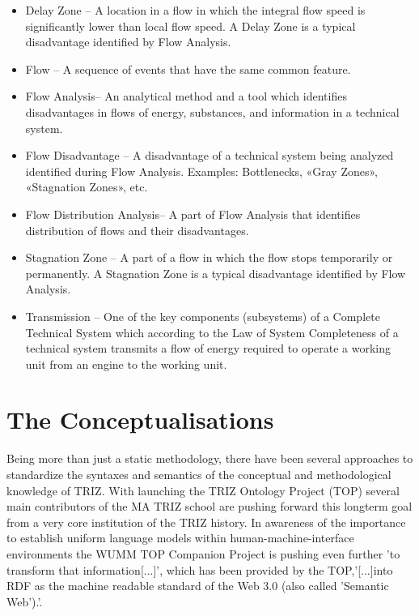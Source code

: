 \documentclass[a4paper,11pt]{article}
\begin{document}
    \begin{itemize}[noitemsep]
        \item Delay Zone -- A location in a flow in which the integral flow speed is
        significantly lower than local flow speed. A Delay Zone is a typical
        disadvantage identified by Flow Analysis. 
        \item Flow -- A sequence of events that have the same common feature.
        \item  Flow Analysis-- An analytical method and a tool which identifies
        disadvantages in flows of energy, substances, and information in a technical
        system.
        \item  Flow Disadvantage -- A disadvantage of a technical system being
        analyzed identified during Flow Analysis. Examples: Bottlenecks, «Gray
        Zones», «Stagnation Zones», etc.
        \item Flow Distribution Analysis-- A part of Flow Analysis that identifies
        distribution of flows and their disadvantages. 
        \item Stagnation Zone -- A part of a flow in which the flow stops temporarily
        or permanently. A Stagnation Zone is a typical disadvantage identified by
        Flow Analysis.
        \item Transmission -- One of the key components (subsystems) of a Complete
        Technical System which according to the Law of System Completeness of a
        technical system transmits a flow of energy required to operate a working
        unit from an engine to the working unit.
    \end{itemize}

    \section{The Conceptualisations}
    Being more than just a static methodology, there have been several approaches
    to standardize the syntaxes and semantics of the conceptual 
    and methodological knowledge of TRIZ. With launching the TRIZ Ontology Project
    (TOP) several main contributors of the MA TRIZ school are pushing forward this 
    longterm goal from a very core institution of the TRIZ history.
    In awareness of the importance to establish uniform language models within 
    human-machine-interface environments the WUMM\cite{WUMM} TOP Companion Project\cite{WUMMTOP}
    is pushing even further 'to transform that information[...]',
    which has been provided by the TOP,'[...]into RDF as 
    the machine readable standard of the Web 3.0 (also called 'Semantic Web').'\cite{WUMMTOP}.     
    
\end{document}
